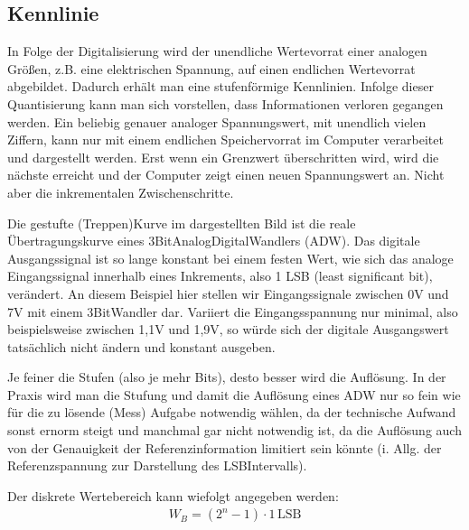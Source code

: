 \documentclass[letterpaper,10pt,english]{jupyterBook}
\begin{document}
\subsection{Kennlinie}
\label{\detokenize{content/2_Digital:kennlinie}}
\sphinxAtStartPar
In Folge der Digitalisierung wird der unendliche Wertevorrat einer analogen Größen, z.B. eine elektrischen Spannung, auf einen endlichen Wertevorrat abgebildet. Dadurch erhält man eine stufenförmige Kennlinien. Infolge dieser Quantisierung kann man sich vorstellen, dass Informationen verloren gegangen werden. Ein beliebig genauer analoger Spannungswert, mit unendlich vielen Ziffern, kann nur mit einem endlichen Speichervorrat im Computer verarbeitet und dargestellt werden. Erst wenn ein Grenzwert überschritten wird, wird die nächste  erreicht und der Computer zeigt einen neuen Spannungswert an. Nicht aber die inkrementalen Zwischenschritte.

\sphinxAtStartPar
{}

\sphinxAtStartPar
Die gestufte (Treppen\sphinxhyphen{})Kurve im dargestellten Bild ist die reale Übertragungskurve eines 3\sphinxhyphen{}Bit\sphinxhyphen{}Analog\sphinxhyphen{}Digital\sphinxhyphen{}Wandlers (ADW).
Das digitale Ausgangssignal ist so lange konstant bei einem festen Wert, wie sich das analoge Eingangssignal innerhalb eines Inkrements, also 1 LSB (least significant bit), verändert. An diesem Beispiel hier stellen wir Eingangssignale zwischen 0V und 7V mit einem 3\sphinxhyphen{}Bit\sphinxhyphen{}Wandler dar. Variiert die Eingangsspannung nur minimal, also beispielsweise zwischen 1,1V und 1,9V, so würde sich der digitale Ausgangswert tatsächlich nicht ändern und konstant  ausgeben.

\sphinxAtStartPar
Je feiner die Stufen (also je mehr Bits), desto besser wird die Auflösung.
In der Praxis wird man die Stufung und damit die Auflösung eines ADW nur so fein wie für die zu lösende (Mess\sphinxhyphen{}) Aufgabe notwendig wählen, da der technische Aufwand sonst ernorm steigt und manchmal gar nicht notwendig ist, da die Auflösung auch von der Genauigkeit der Referenzinformation limitiert sein könnte (i. Allg. der Referenzspannung zur Darstellung des LSB\sphinxhyphen{}Intervalls).

\sphinxAtStartPar
Der diskrete Wertebereich kann wiefolgt angegeben werden:
\begin{equation*}
\begin{split}W_B = (2^n-1) \cdot 1\,\mathrm{LSB}\end{split}
\end{equation*}
\end{document}
